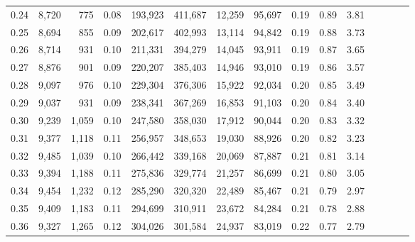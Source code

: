 \begin{tabular}{rrrcrrrrrrrrrrr}
0.24 &   8,720 &    775 &                                       0.08 &  193,923 &  411,687 &   12,259 &   95,697 &  0.19 &  0.89 &                         3.81 \\
0.25 &   8,694 &    855 &                                       0.09 &  202,617 &  402,993 &   13,114 &   94,842 &  0.19 &  0.88 &                         3.73 \\
0.26 &   8,714 &    931 &                                       0.10 &  211,331 &  394,279 &   14,045 &   93,911 &  0.19 &  0.87 &                         3.65 \\
0.27 &   8,876 &    901 &                                       0.09 &  220,207 &  385,403 &   14,946 &   93,010 &  0.19 &  0.86 &                         3.57 \\
0.28 &   9,097 &    976 &                                       0.10 &  229,304 &  376,306 &   15,922 &   92,034 &  0.20 &  0.85 &                         3.49 \\
0.29 &   9,037 &    931 &                                       0.09 &  238,341 &  367,269 &   16,853 &   91,103 &  0.20 &  0.84 &                         3.40 \\
0.30 &   9,239 &  1,059 &                                       0.10 &  247,580 &  358,030 &   17,912 &   90,044 &  0.20 &  0.83 &                         3.32 \\
0.31 &   9,377 &  1,118 &                                       0.11 &  256,957 &  348,653 &   19,030 &   88,926 &  0.20 &  0.82 &                         3.23 \\
0.32 &   9,485 &  1,039 &                                       0.10 &  266,442 &  339,168 &   20,069 &   87,887 &  0.21 &  0.81 &                         3.14 \\
0.33 &   9,394 &  1,188 &                                       0.11 &  275,836 &  329,774 &   21,257 &   86,699 &  0.21 &  0.80 &                         3.05 \\
0.34 &   9,454 &  1,232 &                                       0.12 &  285,290 &  320,320 &   22,489 &   85,467 &  0.21 &  0.79 &                         2.97 \\
0.35 &   9,409 &  1,183 &                                       0.11 &  294,699 &  310,911 &   23,672 &   84,284 &  0.21 &  0.78 &                         2.88 \\
0.36 &   9,327 &  1,265 &                                       0.12 &  304,026 &  301,584 &   24,937 &   83,019 &  0.22 &  0.77 &                         2.79 \\

\end{tabular}
